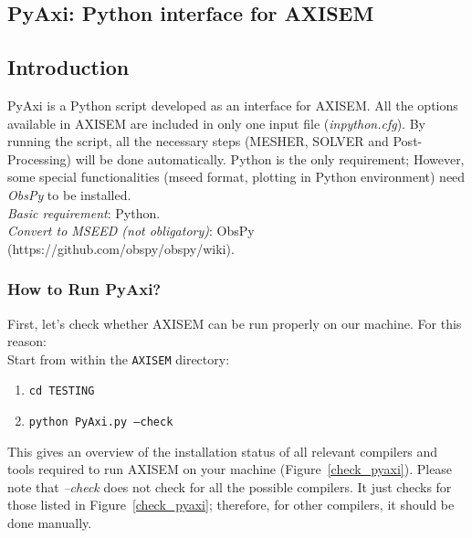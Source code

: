 \subsection{PyAxi: Python interface for AXISEM}

\subsection{Introduction}
PyAxi is a Python script developed as an interface for AXISEM.
All the options available in AXISEM are included in only one input file (\textit{inpython.cfg}).
By running the script, all the necessary steps (MESHER, SOLVER and Post-Processing) will be done automatically.
Python is the only requirement; However, some special functionalities (mseed format, plotting in Python environment) need \textit{ObsPy} to be installed. \\

\noindent \textit{Basic requirement}: Python.\\
\textit{Convert to MSEED (not obligatory)}: ObsPy (https://github.com/obspy/obspy/wiki).\\

\subsubsection{How to Run PyAxi?}
First, let's check whether AXISEM can be run properly on our machine.
For this reason:\\

Start from within the {\tt AXISEM} directory:
\begin{enumerate}
\itemsep0em
\item {\tt cd TESTING}
\item {\tt python PyAxi.py --check}
\end{enumerate}
\noindent This gives an overview of the installation status of all relevant compilers and tools required
to run AXISEM on your machine (Figure~\ref{check_pyaxi}).
Please note that \textit{--check} does not check for all the possible compilers.
It just checks for those listed in Figure~\ref{check_pyaxi};
therefore, for other compilers, it should be done manually.\\


